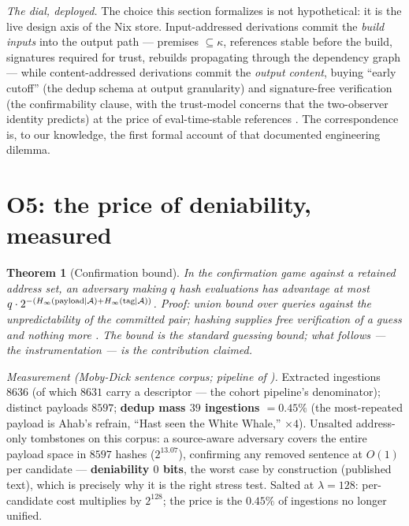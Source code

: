 \documentclass[10pt]{article}
\newtheorem{theorem}{Theorem}
\newcommand{\sub}{\subseteq}
\begin{document}
\noindent\emph{The dial, deployed.} The choice this section formalizes is not hypothetical: it is the live design axis of the Nix store. Input-addressed derivations commit the \emph{build inputs} into the output path --- premises $\sub \kappa$, references stable before the build, signatures required for trust, rebuilds propagating through the dependency graph --- while content-addressed derivations commit the \emph{output content}, buying ``early cutoff'' (the dedup schema at output granularity) and signature-free verification (the confirmability clause, with the trust-model concerns that the two-observer identity predicts) at the price of eval-time-stable references \cite{Dolstra06,NixRFC062}. The correspondence is, to our knowledge, the first formal account of that documented engineering dilemma.

\section{O5: the price of deniability, measured}\label{sec:price}

\begin{theorem}[Confirmation bound]\label{thm:bound}
In the confirmation game against a retained address set, an adversary making $q$ hash evaluations has advantage at most $q \cdot 2^{-(H_\infty(\textnormal{payload} \mid \mathcal{A}) + H_\infty(\textnormal{tag} \mid \mathcal{A}))}$. \emph{Proof:} union bound over queries against the unpredictability of the committed pair; hashing supplies free verification of a guess and nothing more \cite{RogawayShrimpton04}. The bound is the standard guessing bound; what follows --- the instrumentation --- is the contribution claimed.
\end{theorem}

\noindent\emph{Measurement (Moby-Dick sentence corpus; pipeline of \cite[\S Empirics]{growth}).} Extracted ingestions $8636$ (of which $8631$ carry a descriptor --- the cohort pipeline's denominator); distinct payloads $8597$; \textbf{dedup mass $39$ ingestions $= 0.45\%$} (the most-repeated payload is Ahab's refrain, ``Hast seen the White Whale,'' $\times 4$). Unsalted address-only tombstones on this corpus: a source-aware adversary covers the entire payload space in $8597$ hashes ($2^{13.07}$), confirming any removed sentence at $O(1)$ per candidate --- \textbf{deniability $0$ bits}, the worst case by construction (published text), which is precisely why it is the right stress test. Salted at $\lambda = 128$: per-candidate cost multiplies by $2^{128}$; the price is the $0.45\%$ of ingestions no longer unified.
\end{document}
